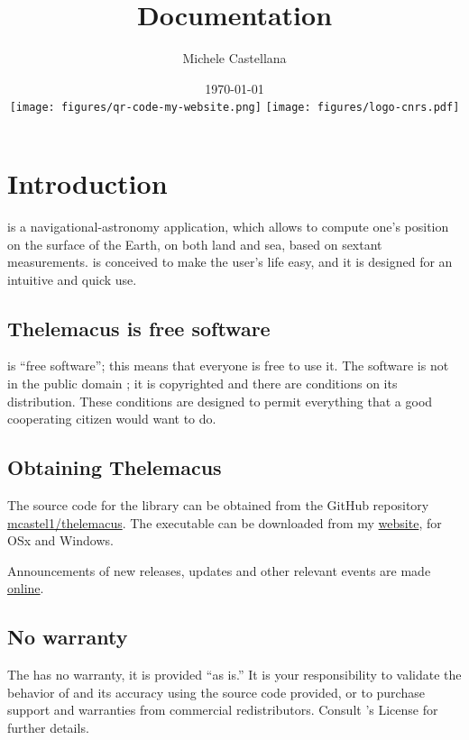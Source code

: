 \documentclass{ol-softwaremanual}
\title{Documentation}
\author{Michele Castellana \\
}
\date{\today\\
\texttt{[image: figures/qr-code-my-website.png]}
\hspace{\stretch{2}} \texttt{[image: figures/logo-cnrs.pdf]}
}
\begin{document}
\maketitle

\tableofcontents
\newpage

\section{Introduction}


\thel  is a navigational-astronomy application, which allows to compute one's position on the surface of the Earth, on both land and sea, based on sextant measurements. \thel is conceived to make the user's life easy, and it is designed for an intuitive and quick use. 

\subsection{Thelemacus is free software}

\thel is ``free software''; this means that everyone is free to use it. The software is not in the public domain \cite{castellana2024thelemacus}; it is copyrighted and there are conditions on its distribution. These conditions are designed to permit everything that a good cooperating citizen would want to do.

\subsection{Obtaining Thelemacus}

The source code for the library can be obtained from the GitHub repository \href{https://github.com/mcastel1/thelemacus}{mcastel1/thelemacus}. The executable can be downloaded from my \href{https://sites.google.com/site/michelecastellana/home}{website}, for OSx and Windows.  

Announcements of new releases, updates and other relevant events are made \href{https://sites.google.com/site/michelecastellana/home}{online}. 

\subsection{No warranty}

The \thel has no warranty, it is provided ``as is.'' It is your responsibility to validate the behavior of \thel and its accuracy using the source code provided, or to purchase support and warranties from commercial redistributors. Consult \thel's  License for further details.
\end{document}
